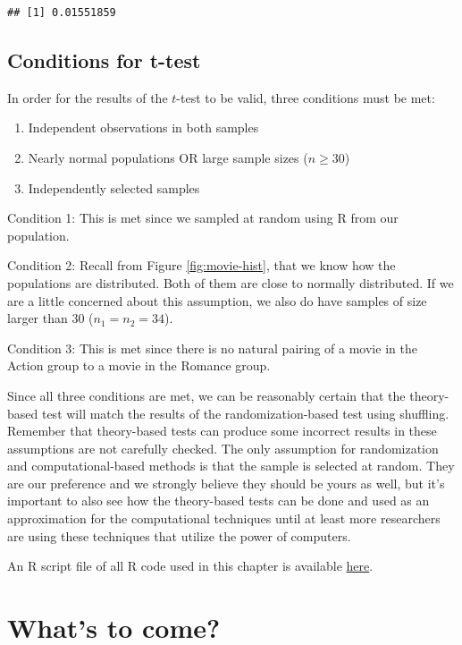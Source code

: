 \documentclass[]{tufte-book}
\providecommand{\tightlist}{%
  \setlength{\itemsep}{0pt}\setlength{\parskip}{0pt}}
\begin{document}
\begin{verbatim}
## [1] 0.01551859
\end{verbatim}

\subsection{Conditions for t-test}\label{conditions-for-t-test}

In order for the results of the \(t\)-test to be valid, three conditions
must be met:

\begin{enumerate}
\def\labelenumi{\arabic{enumi}.}
\tightlist
\item
  Independent observations in both samples
\item
  Nearly normal populations OR large sample sizes (\(n \ge 30\))
\item
  Independently selected samples
\end{enumerate}

Condition 1: This is met since we sampled at random using R from our
population.

Condition 2: Recall from Figure \ref{fig:movie-hist}, that we know how
the populations are distributed. Both of them are close to normally
distributed. If we are a little concerned about this assumption, we also
do have samples of size larger than 30 (\(n_1 = n_2 = 34\)).

Condition 3: This is met since there is no natural pairing of a movie in
the Action group to a movie in the Romance group.

Since all three conditions are met, we can be reasonably certain that
the theory-based test will match the results of the randomization-based
test using shuffling. Remember that theory-based tests can produce some
incorrect results in these assumptions are not carefully checked. The
only assumption for randomization and computational-based methods is
that the sample is selected at random. They are our preference and we
strongly believe they should be yours as well, but it's important to
also see how the theory-based tests can be done and used as an
approximation for the computational techniques until at least more
researchers are using these techniques that utilize the power of
computers.

An R script file of all R code used in this chapter is available
\href{http://ismayc.github.io/moderndiver-book/07-hypo.R}{here}.

\section{What's to come?}\label{whats-to-come-4}
\end{document}
